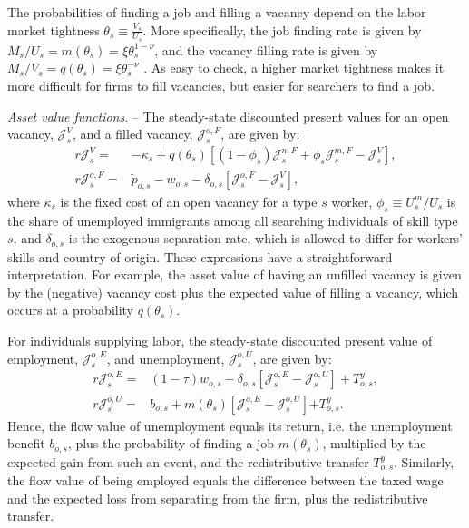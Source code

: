 \documentclass[a4paper,12pt]{article}
\begin{document}
The probabilities of finding a job and filling a vacancy depend on the labor
market tightness $\theta_s \equiv \frac{V_s}{U_s}$. More specifically, the
job finding rate is given by $M_s/U_s=m(\theta_s)=\xi \theta_s^{1-\nu}$, and
the vacancy filling rate is given by $M_s/V_s=q(\theta_s)=\xi \theta_s^{-\nu}$%
. As easy to check, a higher market tightness makes it more difficult
for firms to fill vacancies, but easier for searchers to find a job.


\emph{Asset value functions}. --
The steady-state discounted present values for an open vacancy, $\mathcal{J}%
_{s}^{V}$, and a filled vacancy, $\mathcal{J}_{s}^{o,F}$, are given by: 
\begin{align}
r\mathcal{J}_{s}^{V}=& -\kappa _{s}+q(\theta _{s})\left[ \left( 1-\phi
_{s}\right) \mathcal{J}_{s}^{n,F}+\phi _{s}\mathcal{J}_{s}^{m,F}-\mathcal{J}%
_{s}^{V}\right] ,  \label{Eq:JV} \\
r\mathcal{J}_{s}^{o,F}=& \widetilde{p}_{o,s}-w_{o,s}-\delta _{o,s}\left[ \mathcal{J}%
_{s}^{o,F}-\mathcal{J}_{s}^{V}\right] ,  \label{Eq:JF}
\end{align}%
where $\kappa _{s}$ is the fixed cost of an open vacancy for a type $s$
worker, $\phi _{s}\equiv U_{s}^{m}/U_{s}$ is the share of unemployed
immigrants among all searching individuals of skill type $s$, and $\delta
_{o,s}$ is the exogenous separation rate, which is allowed to differ for
workers' skills and country of origin. These expressions have a straightforward
interpretation. For example, the asset value of having an unfilled vacancy
is given by the (negative) vacancy cost plus the expected value of filling a
vacancy, which occurs at a probability $q(\theta _{s})$.

For individuals supplying labor, the steady-state discounted present value
of employment, $\mathcal{J}_{s}^{o,E}$, and unemployment, $\mathcal{J}%
_{s}^{o,U}$, are given by: 
\begin{align}
r\mathcal{J}_{s}^{o,E}=& (1-\tau )w_{o,s}-\delta _{o,s}\left[ \mathcal{J}%
_{s}^{o,E}-\mathcal{J}_{s}^{o,U}\right] +T^y_{o,s} ,  \label{Eq:JE} \\
r\mathcal{J}_{s}^{o,U}=& b_{o,s}+m\left( \theta _{s}\right) \left[ \mathcal{J%
}_{s}^{o,E}-\mathcal{J}_{s}^{o,U}\right]{+T^y_{o,s}} .  \label{Eq:JU}
\end{align}%
Hence, the flow value of unemployment equals its return, i.e. the
unemployment benefit $b_{o,s}$, plus the probability of finding a job $m(\theta_s)$,
multiplied by the expected gain from such an event, and the redistributive transfer $T^y_{o,s}$. Similarly, the flow value
of being employed equals the difference between the taxed wage and the
expected loss from separating from the firm, plus the redistributive transfer.
\end{document}

